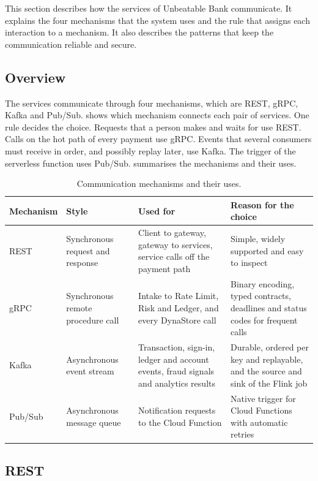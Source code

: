 \documentclass[11pt,a4paper]{article}
\newcommand{\project}{Unbeatable Bank}
\begin{document}
This section describes how the services of \project{} communicate. It explains the four mechanisms that the system uses and the rule that assigns each interaction to a mechanism. It also describes the patterns that keep the communication reliable and secure.

\subsection{Overview}
\label{sec:comm-overview}

The services communicate through four mechanisms, which are REST, gRPC, Kafka and Pub/Sub.  shows which mechanism connects each pair of services. One rule decides the choice. Requests that a person makes and waits for use REST. Calls on the hot path of every payment use gRPC. Events that several consumers must receive in order, and possibly replay later, use Kafka. The trigger of the serverless function uses Pub/Sub.  summarises the mechanisms and their uses.

\begin{table}[H]\centering\small
\caption{Communication mechanisms and their uses.}\label{tab:mechanisms}
\begin{tabularx}{\linewidth}{@{}L{2.0cm}L{2.6cm}YY@{}}
\toprule
Mechanism & Style & Used for & Reason for the choice \\
\midrule
REST & Synchronous request and response & Client to gateway, gateway to services, service calls off the payment path & Simple, widely supported and easy to inspect \\
gRPC & Synchronous remote procedure call & Intake to Rate Limit, Risk and Ledger, and every DynaStore call & Binary encoding, typed contracts, deadlines and status codes for frequent calls \\
Kafka & Asynchronous event stream & Transaction, sign-in, ledger and account events, fraud signals and analytics results & Durable, ordered per key and replayable, and the source and sink of the Flink job \\
Pub/Sub & Asynchronous message queue & Notification requests to the Cloud Function & Native trigger for Cloud Functions with automatic retries \\
\bottomrule
\end{tabularx}
\end{table}

\subsection{REST}
\label{sec:rest}
\end{document}
